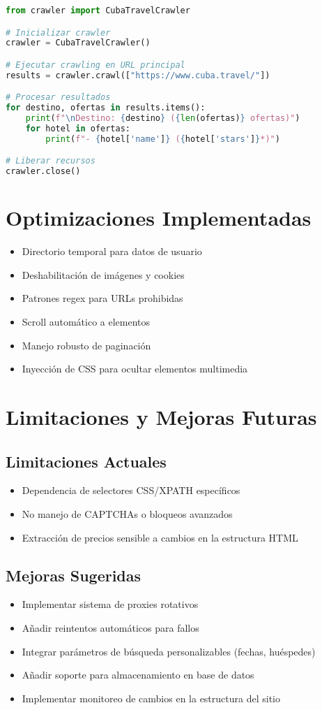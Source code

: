 \documentclass[a4paper,11pt]{article}
\begin{document}
\begin{lstlisting}[language=Python, caption=Ejemplo de implementación]
from crawler import CubaTravelCrawler

# Inicializar crawler
crawler = CubaTravelCrawler()

# Ejecutar crawling en URL principal
results = crawler.crawl(["https://www.cuba.travel/"])

# Procesar resultados
for destino, ofertas in results.items():
    print(f"\nDestino: {destino} ({len(ofertas)} ofertas)")
    for hotel in ofertas:
        print(f"- {hotel['name']} ({hotel['stars']}*)")

# Liberar recursos
crawler.close()
\end{lstlisting}

\section{Optimizaciones Implementadas}
\begin{itemize}
    \item Directorio temporal para datos de usuario
    \item Deshabilitación de imágenes y cookies
    \item Patrones regex para URLs prohibidas
    \item Scroll automático a elementos
    \item Manejo robusto de paginación
    \item Inyección de CSS para ocultar elementos multimedia
\end{itemize}

\section{Limitaciones y Mejoras Futuras}
\subsection{Limitaciones Actuales}
\begin{itemize}
    \item Dependencia de selectores CSS/XPATH específicos
    \item No manejo de CAPTCHAs o bloqueos avanzados
    \item Extracción de precios sensible a cambios en la estructura HTML
\end{itemize}

\subsection{Mejoras Sugeridas}
\begin{itemize}
    \item Implementar sistema de proxies rotativos
    \item Añadir reintentos automáticos para fallos
    \item Integrar parámetros de búsqueda personalizables (fechas, huéspedes)
    \item Añadir soporte para almacenamiento en base de datos
    \item Implementar monitoreo de cambios en la estructura del sitio
\end{itemize}
\end{document}
